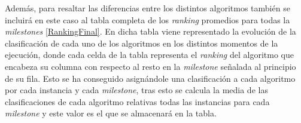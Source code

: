 Además, para resaltar las diferencias entre los distintos algoritmos también se incluirá en este caso al tabla completa de los \textit{ranking} promedios para todas la \textit{milestones} \ref{RankingFinal}. 
En dicha tabla viene representado la evolución de la clasificación de cada uno de los algoritmos en los distintos momentos de la ejecución, donde cada celda de la tabla representa el \textit{ranking} del algoritmo que encabeza su columna con respecto al resto en la \textit{milestone} señalada al principio de su fila. 
Esto se ha conseguido asignándole una clasificación a cada algoritmo por cada instancia y cada \textit{milestone}, tras esto se calcula la media de las clasificaciones de cada algoritmo relativas todas las instancias para cada \textit{milestone} y este valor es el que se almacenará en la tabla.

